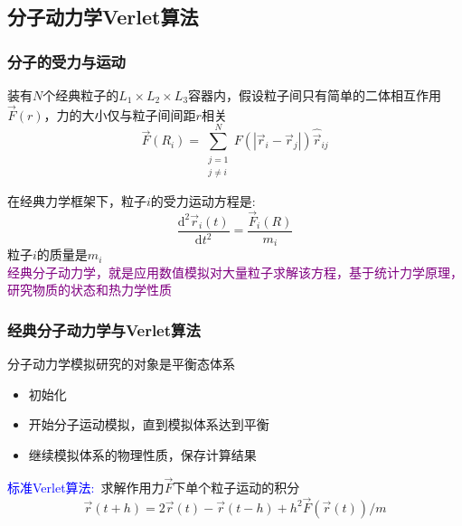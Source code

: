 \subsection{分子动力学\rm{Verlet}算法}
\frame
{
	\frametitle{分子的受力与运动}
	装有$N$个经典粒子的$L_1\times L_2\times L_3$容器内，假设粒子间只有简单的二体相互作用%
	$\vec F(r)$，力的大小仅与粒子间间距$r$相关
	\begin{displaymath}
		\vec F(R_i)=\sum_{\substack{j=1\\j\neq i}}^N F(|\vec r_i-\vec r_j|)\hat{\vec r}_{ij}
	\end{displaymath}
	{\fontsize{7.2pt}{6.2pt}}

	在经典力学框架下，粒子$i$的受力运动方程是:~
	\begin{displaymath}
		\dfrac{\mathrm{d}^2\vec r_i(t)}{\mathrm{d}t^2}=\dfrac{\vec F_i(R)}{m_i}
	\end{displaymath}
	粒子$i$的质量是$m_i$\\
	\textcolor{purple}{经典分子动力学，就是应用数值模拟对大量粒子求解该方程，基于统计力学原理，研究物质的状态和热力学性质}
}

\frame
{
	\frametitle{经典分子动力学与\textrm{Verlet}算法}
	分子动力学模拟研究的对象是平衡态体系
	\begin{itemize}
		\item 初始化
		\item 开始分子运动模拟，直到模拟体系达到平衡
		\item 继续模拟体系的物理性质，保存计算结果
	\end{itemize}
	\textcolor{blue}{标准\textrm{Verlet}算法:~}求解作用力$\vec F$下单个粒子运动的积分
	\begin{displaymath}
		\vec r(t+h)=2\vec r(t)-\vec r(t-h)+h^2\vec F(\vec r(t))/m
	\end{displaymath}
	{\fontsize{7.2pt}{6.2pt}}
}

